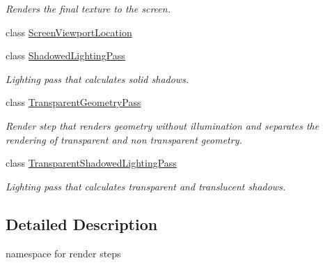 \begin{DoxyCompactItemize}
\begin{DoxyCompactList}\small\item\em Renders the final texture to the screen. \end{DoxyCompactList}\item 
class \mbox{\hyperlink{class_geometry_engine_1_1_geometry_render_step_1_1_screen_viewport_location}{Screen\+Viewport\+Location}}
\item 
class \mbox{\hyperlink{class_geometry_engine_1_1_geometry_render_step_1_1_shadowed_lighting_pass}{Shadowed\+Lighting\+Pass}}
\begin{DoxyCompactList}\small\item\em Lighting pass that calculates solid shadows. \end{DoxyCompactList}\item 
class \mbox{\hyperlink{class_geometry_engine_1_1_geometry_render_step_1_1_transparent_geometry_pass}{Transparent\+Geometry\+Pass}}
\begin{DoxyCompactList}\small\item\em Render step that renders geometry without illumination and separates the rendering of transparent and non transparent geometry. \end{DoxyCompactList}\item 
class \mbox{\hyperlink{class_geometry_engine_1_1_geometry_render_step_1_1_transparent_shadowed_lighting_pass}{Transparent\+Shadowed\+Lighting\+Pass}}
\begin{DoxyCompactList}\small\item\em Lighting pass that calculates transparent and translucent shadows. \end{DoxyCompactList}\end{DoxyCompactItemize}


\subsection{Detailed Description}
namespace for render steps 
